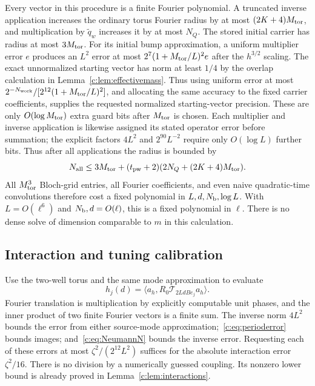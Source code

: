 Every vector in this procedure is a finite Fourier polynomial. A
truncated inverse application increases the ordinary torus Fourier
radius by at most $(2K+4)M_{\rm tor}$, and multiplication by $\widetilde q_w$ increases it
by at most $N_Q$. The stored initial carrier has radius at most $3M_{\rm tor}$. For its initial bump
approximation, a uniform multiplier error $e$ produces an $L^2$
error at most $2^7(1+M_{\rm tor}/L)^2e$ after the $h^{3/2}$ scaling.
The exact unnormalized starting vector has norm at least $1/4$
by the overlap calculation in Lemma~\ref{c:lem:effectivemass}.
Thus using uniform error at most
$2^{-N_{\rm work}}/[2^{12}(1+M_{\rm tor}/L)^2]$, and allocating the
same accuracy to the fixed carrier coefficients, supplies the
requested normalized starting-vector precision. These are only
$O(\log M_{\rm tor})$ extra guard bits after $M_{\rm tor}$ is chosen. Each multiplier
and inverse application is likewise assigned its stated operator
error before summation; the explicit factors $4L^2$ and $2^{90}L^{-2}$
require only $O(\log L)$ further bits.
Thus after all applications the radius is bounded by
\begin{equation}
 N_{\rm all}\le3M_{\rm tor}+(t_{\rm pw}+2)(2N_Q+(2K+4)M_{\rm tor}).
                                                               \label{c:eq:allfreq}
\end{equation}
All $M_{\rm tor}^3$ Bloch-grid entries, all Fourier coefficients, and even naive
quadratic-time convolutions therefore cost a fixed polynomial in
$L,d,N_{\rm b},\log L$. With $L=O(\ell^6)$ and $N_{\rm b},d=O(\ell)$, this is a
fixed polynomial in $\ell$. There is no dense solve of dimension
comparable to $m$ in this calculation.

\subsection{Interaction and tuning calibration}
Use the two-well torus and the same mode approximation to evaluate
\[
 h_j(d)=\langle a_h,R_0\mathcal T_{2LdBe_j}a_h\rangle.
\]
Fourier translation is multiplication by explicitly computable unit
phases, and the inner product of two finite Fourier vectors is a
finite sum. The inverse norm $4L^2$ bounds the error from either
source-mode approximation;~\eqref{c:eq:perioderror} bounds images;
and~\eqref{c:eq:NeumannN} bounds the inverse error. Requesting each
of these errors at most $\zeta^2/(2^{12}L^2)$ suffices for the
absolute interaction error $\zeta^2/16$. There is no division by a
numerically guessed coupling. Its nonzero lower bound is already
proved in Lemma~\ref{c:lem:interactions}.

